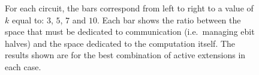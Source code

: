 \begin{figure}
\centering
{}
\caption{For each circuit, the bars correspond from left to right to a value of \(k\) equal to: \(3\), \(5\), \(7\) and \(10\). Each bar shows the ratio between the space that must be dedicated to communication (i.e.\ managing ebit halves) and the space dedicated to the computation itself. The results shown are for the best combination of active extensions in each case.}
\label{fig:results4}
\end{figure}

